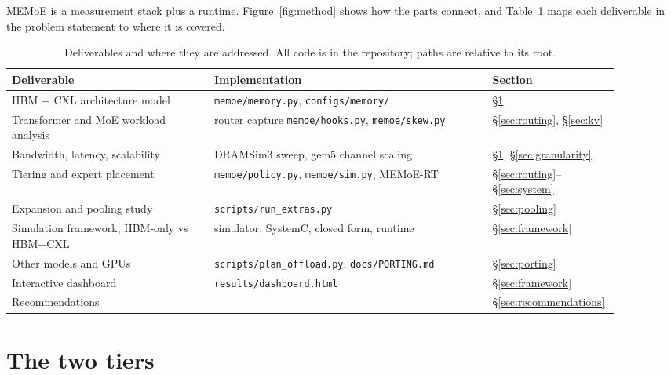 \documentclass[10pt,a4paper]{article}
\begin{document}
MEMoE is a measurement stack plus a runtime. Figure~\ref{fig:method} shows how
the parts connect, and Table~\ref{tab:deliverables} maps each deliverable in the
problem statement to where it is covered.

\begin{table}[htbp]
\centering\small
\caption{Deliverables and where they are addressed. All code is in the
repository; paths are relative to its root.}
\label{tab:deliverables}
\begin{tabular}{>{\raggedright\arraybackslash}p{0.32\linewidth}>{\raggedright\arraybackslash}p{0.44\linewidth}>{\raggedright\arraybackslash}p{0.14\linewidth}}
\toprule
Deliverable & Implementation & Section \\
\midrule
HBM + CXL architecture model & \texttt{memoe/memory.py}, \texttt{configs/memory/} & \S\ref{sec:tier} \\
Transformer and MoE workload analysis & router capture \texttt{memoe/hooks.py}, \texttt{memoe/skew.py} & \S\ref{sec:routing}, \S\ref{sec:kv} \\
Bandwidth, latency, scalability & DRAMSim3 sweep, gem5 channel scaling & \S\ref{sec:tier}, \S\ref{sec:granularity} \\
Tiering and expert placement & \texttt{memoe/policy.py}, \texttt{memoe/sim.py}, MEMoE-RT & \S\ref{sec:routing}--\S\ref{sec:system} \\
Expansion and pooling study & \texttt{scripts/run\_extras.py} & \S\ref{sec:pooling} \\
Simulation framework, HBM-only vs HBM+CXL & simulator, SystemC, closed form, runtime & \S\ref{sec:framework} \\
Other models and GPUs & \texttt{scripts/plan\_offload.py}, \texttt{docs/PORTING.md} & \S\ref{sec:porting} \\
Interactive dashboard & \texttt{results/dashboard.html} & \S\ref{sec:framework} \\
Recommendations & & \S\ref{sec:recommendations} \\
\bottomrule
\end{tabular}
\end{table}



\section{The two tiers}
\label{sec:tier}
\end{document}
